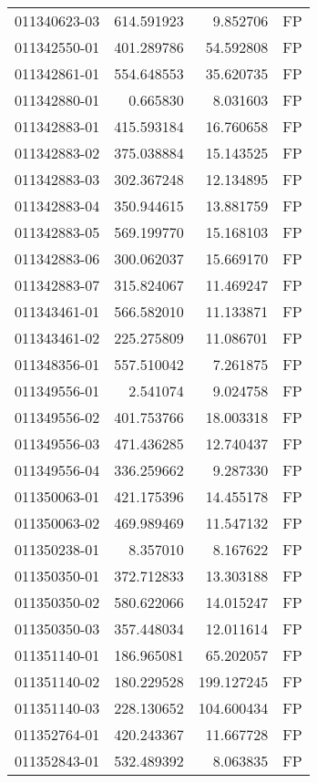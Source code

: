 \begin{tabular}{lrrl}
011340623-03 &  614.591923 &     9.852706 &   FP \\
011342550-01 &  401.289786 &    54.592808 &   FP \\
011342861-01 &  554.648553 &    35.620735 &   FP \\
011342880-01 &    0.665830 &     8.031603 &   FP \\
011342883-01 &  415.593184 &    16.760658 &   FP \\
011342883-02 &  375.038884 &    15.143525 &   FP \\
011342883-03 &  302.367248 &    12.134895 &   FP \\
011342883-04 &  350.944615 &    13.881759 &   FP \\
011342883-05 &  569.199770 &    15.168103 &   FP \\
011342883-06 &  300.062037 &    15.669170 &   FP \\
011342883-07 &  315.824067 &    11.469247 &   FP \\
011343461-01 &  566.582010 &    11.133871 &   FP \\
011343461-02 &  225.275809 &    11.086701 &   FP \\
011348356-01 &  557.510042 &     7.261875 &   FP \\
011349556-01 &    2.541074 &     9.024758 &   FP \\
011349556-02 &  401.753766 &    18.003318 &   FP \\
011349556-03 &  471.436285 &    12.740437 &   FP \\
011349556-04 &  336.259662 &     9.287330 &   FP \\
011350063-01 &  421.175396 &    14.455178 &   FP \\
011350063-02 &  469.989469 &    11.547132 &   FP \\
011350238-01 &    8.357010 &     8.167622 &   FP \\
011350350-01 &  372.712833 &    13.303188 &   FP \\
011350350-02 &  580.622066 &    14.015247 &   FP \\
011350350-03 &  357.448034 &    12.011614 &   FP \\
011351140-01 &  186.965081 &    65.202057 &   FP \\
011351140-02 &  180.229528 &   199.127245 &   FP \\
011351140-03 &  228.130652 &   104.600434 &   FP \\
011352764-01 &  420.243367 &    11.667728 &   FP \\
011352843-01 &  532.489392 &     8.063835 &   FP \\

\end{tabular}
